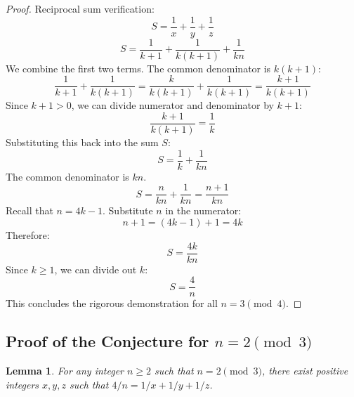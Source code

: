 \documentclass[12pt,a4paper]{article}
\newtheorem{lemma}[theorem]{Lemma}
\begin{document}
\begin{proof}
Reciprocal sum verification:
\begin{equation}
S = \frac{1}{x} + \frac{1}{y} + \frac{1}{z}
\end{equation}
\begin{equation}
S = \frac{1}{k+1} + \frac{1}{k(k+1)} + \frac{1}{kn}
\end{equation}
We combine the first two terms. The common denominator is $k(k+1)$:
\begin{equation}
\frac{1}{k+1} + \frac{1}{k(k+1)} = \frac{k}{k(k+1)} + \frac{1}{k(k+1)} = \frac{k+1}{k(k+1)}
\end{equation}
Since $k+1 > 0$, we can divide numerator and denominator by $k+1$:
\begin{equation}
\frac{k+1}{k(k+1)} = \frac{1}{k}
\end{equation}
Substituting this back into the sum $S$:
\begin{equation}
S = \frac{1}{k} + \frac{1}{kn}
\end{equation}
The common denominator is $kn$.
\begin{equation}
S = \frac{n}{kn} + \frac{1}{kn} = \frac{n+1}{kn}
\end{equation}
Recall that $n = 4k - 1$. Substitute $n$ in the numerator:
\begin{equation}
n + 1 = (4k - 1) + 1 = 4k
\end{equation}
Therefore:
\begin{equation}
S = \frac{4k}{kn}
\end{equation}
Since $k \geq 1$, we can divide out $k$:
\begin{equation}
S = \frac{4}{n}
\end{equation}
This concludes the rigorous demonstration for all $n = 3 \pmod 4$.
\end{proof}

\newpage
\subsection{Proof of the Conjecture for $n = 2 \pmod 3$}
\begin{lemma}
\label{lem:mod3_case_2}
For any integer $n \geq 2$ such that $n = 2 \pmod 3$, there exist positive integers $x, y, z$ such that $4/n = 1/x + 1/y + 1/z$.
\end{lemma}
\end{document}
